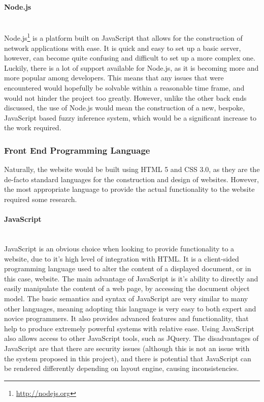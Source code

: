 \paragraph{Node.js}\ \\
Node.js\footnote{\url{http://nodejs.org}} is a platform built on JavaScript that allows for the construction of network applications with ease. It is quick and easy to set up a basic server, however, can become quite confusing and difficult to set up a more complex one. Luckily, there is a lot of support available for Node.js, as it is becoming more and more popular among developers. This means that any issues that were encountered would hopefully be solvable within a reasonable time frame, and would not hinder the project too greatly. However, unlike the other back ends discussed, the use of Node.js would mean the construction of a new, bespoke, JavaScript based fuzzy inference system, which would be a significant increase to the work required. 

\subsubsection{Front End Programming Language}
Naturally, the website would be built using HTML 5 and CSS 3.0, as they are the de-facto standard languages for the construction and design of websites. However, the most appropriate language to provide the actual functionality to the website required some research. 

\paragraph{JavaScript}\ \\
JavaScript is an obvious choice when looking to provide functionality to a website, due to it's high level of integration with HTML. It is a client-sided programming language used to alter the content of a displayed document, or in this case, website. The main advantage of JavaScript is it's ability to directly and easily manipulate the content of a web page, by accessing the document object model. The basic semantics and syntax of JavaScript are very similar to many other languages, meaning adopting this language is very easy to both expert and novice programmers. It also provides advanced features and functionality, that help to produce extremely powerful systems with relative ease. Using JavaScript also allows access to other JavaScript tools, such as JQuery. The disadvantages of JavaScript are that there are security issues (although this is not an issue with the system proposed in this project), and there is potential that JavaScript can be rendered differently depending on layout engine, causing inconsistencies.

